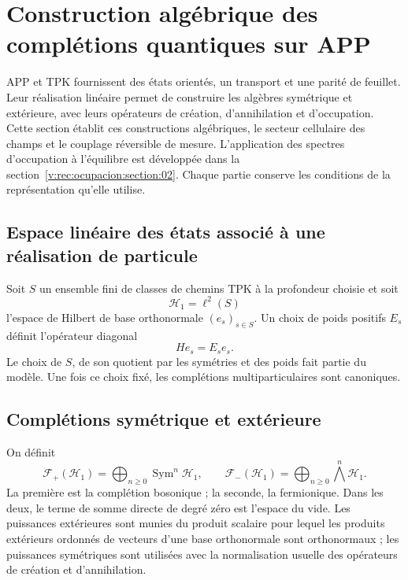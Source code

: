 \section{Construction algébrique des complétions quantiques sur APP}
\label{v:rec:chap:completaciones-cuanticas}
\label{v:sec:completaciones-algebraicas}

APP et TPK fournissent des états orientés, un transport et une parité de feuillet.
Leur réalisation linéaire permet de construire les algèbres symétrique et extérieure,
avec leurs opérateurs de création, d’annihilation et d’occupation. Cette section
établit ces constructions algébriques, le secteur cellulaire des champs et
le couplage réversible de mesure. L’application des spectres d’occupation à l’équilibre est développée dans la section~\ref{v:rec:ocupacion:section:02}.
Chaque partie conserve les conditions de la représentation qu’elle utilise.

\subsection{Espace linéaire des états associé à une réalisation de particule}
\label{v:rec:completaciones:section:02}

Soit \(S\) un ensemble fini de classes de chemins TPK à la profondeur choisie
et soit
\[
 \mathcal H_1=\ell^2(S)
\]
l’espace de Hilbert de base orthonormale \((e_s)_{s\in S}\). Un choix de
poids positifs \(E_s\) définit l’opérateur diagonal
\[
 He_s=E_se_s.
\]
Le choix de \(S\), de son quotient par les symétries et des poids fait partie
du modèle. Une fois ce choix fixé, les complétions multiparticulaires sont canoniques.

\subsection{Complétions symétrique et extérieure}
\label{v:rec:completaciones:section:03}

On définit
\[
 \mathcal F_+(\mathcal H_1)=
 \bigoplus_{n\geq0}\operatorname{Sym}^n\mathcal H_1,
 \qquad
 \mathcal F_-(\mathcal H_1)=
 \bigoplus_{n\geq0}\bigwedge^n\mathcal H_1.
\]
La première est la complétion bosonique ; la seconde, la fermionique. Dans les deux,
le terme de somme directe de degré zéro est l’espace du vide. Les puissances extérieures
sont munies du produit scalaire pour lequel les produits extérieurs ordonnés de vecteurs
d’une base orthonormale sont orthonormaux ; les puissances symétriques sont utilisées
avec la normalisation usuelle des opérateurs de création et d’annihilation.

